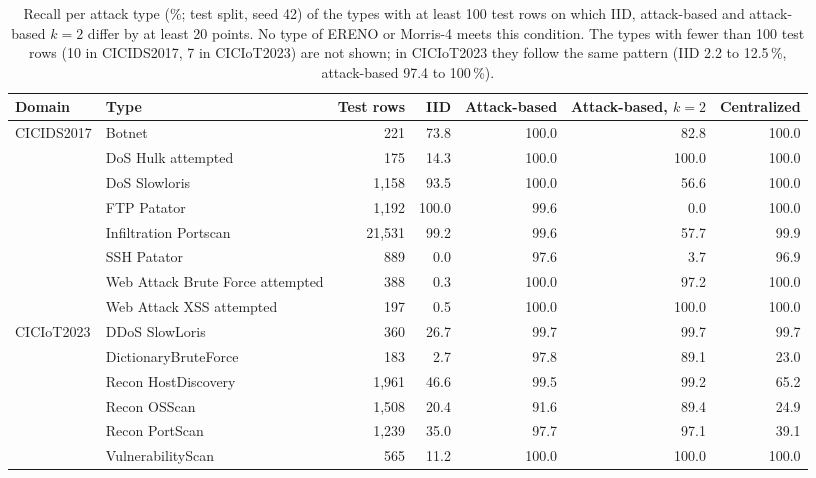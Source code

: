 \begin{table}[htbp]
\centering
\caption{Recall per attack type (\%; test split, seed 42) of the types with at least 100 test rows on which IID, attack-based and attack-based $k{=}2$ differ by at least 20 points. No type of ERENO or Morris-4 meets this condition. The types with fewer than 100 test rows (10 in CICIDS2017, 7 in CICIoT2023) are not shown; in CICIoT2023 they follow the same pattern (IID 2.2 to 12.5\,\%, attack-based 97.4 to 100\,\%).}
\label{tab:pertype}
\small
\begin{tabular}{@{}llrrrrr@{}}
\toprule
Domain & Type & Test rows & IID & Attack-based & Attack-based, $k{=}2$ & Centralized \\
\midrule
\multirow{8}{*}{CICIDS2017} & Botnet & 221 & 73.8 & 100.0 & 82.8 & 100.0 \\
 & DoS Hulk attempted & 175 & 14.3 & 100.0 & 100.0 & 100.0 \\
 & DoS Slowloris & 1,158 & 93.5 & 100.0 & 56.6 & 100.0 \\
 & FTP Patator & 1,192 & 100.0 & 99.6 & 0.0 & 100.0 \\
 & Infiltration Portscan & 21,531 & 99.2 & 99.6 & 57.7 & 99.9 \\
 & SSH Patator & 889 & 0.0 & 97.6 & 3.7 & 96.9 \\
 & Web Attack Brute Force attempted & 388 & 0.3 & 100.0 & 97.2 & 100.0 \\
 & Web Attack XSS attempted & 197 & 0.5 & 100.0 & 100.0 & 100.0 \\
\midrule
\multirow{6}{*}{CICIoT2023} & DDoS SlowLoris & 360 & 26.7 & 99.7 & 99.7 & 99.7 \\
 & DictionaryBruteForce & 183 & 2.7 & 97.8 & 89.1 & 23.0 \\
 & Recon HostDiscovery & 1,961 & 46.6 & 99.5 & 99.2 & 65.2 \\
 & Recon OSScan & 1,508 & 20.4 & 91.6 & 89.4 & 24.9 \\
 & Recon PortScan & 1,239 & 35.0 & 97.7 & 97.1 & 39.1 \\
 & VulnerabilityScan & 565 & 11.2 & 100.0 & 100.0 & 100.0 \\
\bottomrule
\end{tabular}
\end{table}
